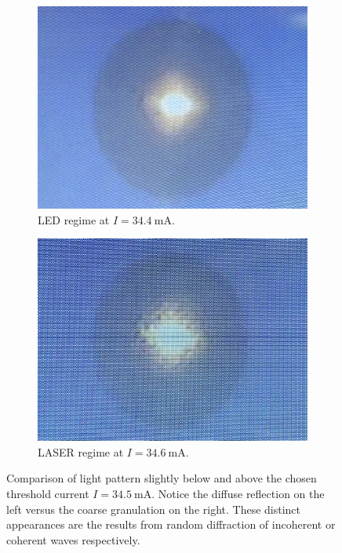 \begin{figure}
    \begin{subfigure}{0.48\textwidth}
        \centering
        \includegraphics[width=\linewidth]{content/measurement/led.jpg}
        \caption{LED regime at $I = \qty{34.4}{\milli\ampere}$.}
        \label{fig:pattern_led}
    \end{subfigure}
    \hfill
    \begin{subfigure}{0.48\textwidth}
        \centering
        \includegraphics[width=\linewidth]{content/measurement/laser.jpg}
        \caption{LASER regime at $I = \qty{34.6}{\milli\ampere}$.}
        \label{fig:pattern_laser}
    \end{subfigure}
    \caption{Comparison of light pattern slightly below and above the chosen threshold current $I = \qty{34.5}{\milli\ampere}$.
             Notice the diffuse reflection on the left versus the coarse granulation on the right. These distinct appearances
             are the results from random diffraction of incoherent or coherent waves respectively.}
    \label{fig:pattern}
\end{figure}

